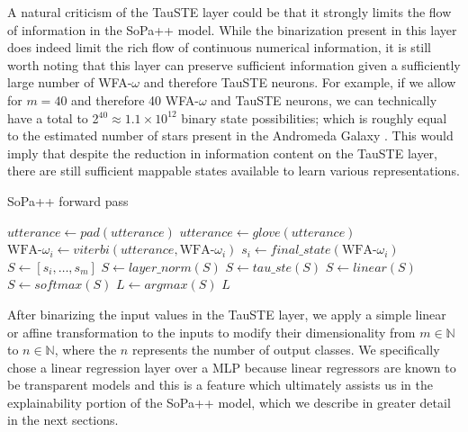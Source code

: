 A natural criticism of the TauSTE layer could be that it strongly limits the
flow of information in the SoPa++ model. While the binarization present in this
layer does indeed limit the rich flow of continuous numerical information, it is
still worth noting that this layer can preserve sufficient information given a
sufficiently large number of WFA-$\omega$ and therefore TauSTE neurons. For
example, if we allow for $m=40$ and therefore 40 WFA-$\omega$ and TauSTE
neurons, we can technically have a total to 2$^{40}\approx1.1\times10^{12}$
binary state possibilities; which is roughly equal to the estimated number of stars
present in the Andromeda Galaxy \citep{10.1093/mnras/stu879}. This would imply
that despite the reduction in information content on the TauSTE layer, there are
still sufficient mappable states available to learn various representations.

\begin{algorithm}[t!]
  \small
  \caption{SoPa++ forward pass}
  \label{algo:spp-forward}
  \begin{algorithmic}[1]
    \Statex
    \Begin
    \State $utterance \gets pad(utterance)$ 
    \State $utterance \gets glove(utterance)$ 
    \State $\text{WFA-}\omega_i \gets viterbi(utterance, \text{WFA-}\omega_i)$
    \State $s_i \gets final\_state(\text{WFA-}\omega_i)$ 
    \EndFor
    \State $S \gets [s_i,\ldots,s_m]$ 
    \State $S \gets layer\_norm(S)$ 
    \State $S \gets tau\_ste(S)$  
    \State $S \gets linear(S)$ 
    \State $S \gets softmax(S)$ 
    \State $L \gets argmax(S)$ 
    \State \Return $L$
    \End
  \end{algorithmic}
\end{algorithm}

After binarizing the input values in the TauSTE layer, we apply a simple linear
or affine transformation to the inputs to modify their dimensionality from $m
\in \mathbb{N}$ to $n \in \mathbb{N}$, where the $n$ represents the number of
output classes. We specifically chose a linear regression layer over a MLP
because linear regressors are known to be transparent models
\citep{arrieta2020explainable} and this is a feature which ultimately assists us
in the explainability portion of the SoPa++ model, which we describe in greater
detail in the next sections.

